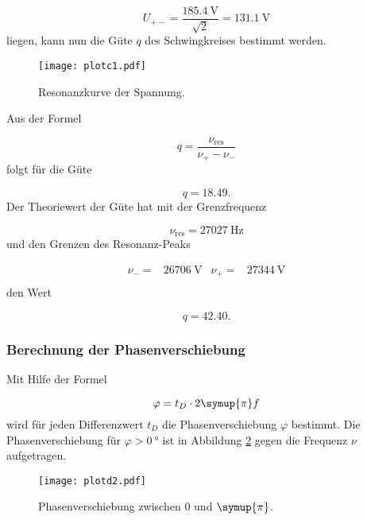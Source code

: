 \begin{equation}
  U_{+-} = \frac{\SI{185.4}{\V}}{\sqrt{2}} = \SI{131.1}{\V}
\end{equation}
liegen, kann nun die Güte $q$ des Schwingkreises bestimmt werden.

\begin{figure}[h]
  \centering
  \texttt{[image: plotc1.pdf]}
  \caption{Resonanzkurve der Spannung.}
  \label{fig:plotc1}
\end{figure}

Aus der Formel

\begin{equation}
  q = \frac{\nu_\text{res}}{\nu_+ - \nu_-}
\end{equation}
folgt für die Güte

\begin{equation}
  q = 18.49.
\end{equation}
Der Theoriewert der Güte hat mit der Grenzfrequenz

\begin{equation}
  \nu_\text{res} = \SI{27027}{\hertz}
\end{equation}
und den Grenzen des Resonanz-Peaks

\begin{align}
  \nu_- = & \SI{26706}{\V} & \nu_+ = & \SI{27344}{\V} \\
\end{align}
den Wert

\begin{equation}
  q = 42.40 .
\end{equation}

\subsubsection{Berechnung der Phasenverschiebung}

Mit Hilfe der Formel

\begin{equation}
  \varphi = t_D \cdot 2\symup{\pi}f
\end{equation}
wird für jeden Differenzwert $t_D$ die Phasenverschiebung $\varphi$ bestimmt.
Die Phasenverschiebung für $\varphi > \SI{0}{\degree}$ ist in Abbildung
\ref{fig:Phasegros} gegen die Frequenz $\nu$ aufgetragen.

\begin{figure}
  \centering
  \texttt{[image: plotd2.pdf]}
  \caption{Phasenverschiebung zwischen $0$ und $\symup{\pi}$.}
  \label{fig:Phasegros}
\end{figure}

